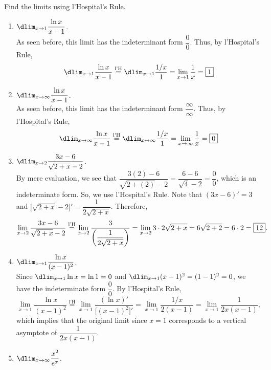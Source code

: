 \documentclass{book}
\newcommand{\lHeq}{\overset{\text{l'H}}{=}}
\begin{document}
\begin{Exam} Find the limits using l'Hospital's Rule.\\
\begin{enumerate}
\item $\dlim_{x\to 1} \dfrac{\ln x}{x-1}$.\\

As seen before, this limit has the indeterminant form $\dfrac{0}{0}$. Thus, by l'Hospital's Rule,
\[\dlim_{x\to 1} \dfrac{\ln x}{x-1} \lHeq \dlim_{x\to 1} \dfrac{1/x}{1} = \lim_{x\to 1} \dfrac{1}{x} = \fbox{$1$}\]\vs

\item $\dlim_{x\to \infty} \dfrac{\ln x}{x-1}$.\\

As seen before, this limit has the indeterminant form $\dfrac{\infty}{\infty}$. Thus, by l'Hospital's Rule,
\[\dlim_{x\to \infty} \dfrac{\ln x}{x-1} \lHeq \dlim_{x\to \infty} \dfrac{1/x}{1} = \lim_{x\to \infty} \dfrac{1}{x} = \fbox{$0$}\]\vs

\item $\dlim_{x\to 2} \dfrac{3x-6}{\sqrt{2+x} - 2}$.\\

By mere evaluation, we see that $\dfrac{3(2) - 6}{\sqrt{2+(2)} - 2} = \dfrac{6-6}{\sqrt{4}-2} = \dfrac{0}{0}$, which is an indeterminate form. So, we use l'Hospital's Rule. Note that $(3x-6)' = 3$ and $\big[\sqrt{2+x}-2\big]' = \dfrac{1}{2\sqrt{2+x}}$. Therefore, \[\lim_{x\to 2} \dfrac{3x-6}{\sqrt{2+x} - 2} \lHeq \lim_{x\to 2} \dfrac{3}{\left(\dfrac{1}{2\sqrt{2+x}}\right)} = \lim_{x\to 2} 3\cdot2\sqrt{2+x} = 6\sqrt{2+2} = 6\cdot 2 = \fbox{$12$}.\]\vs

\item $\dlim_{x\to 1} \dfrac{\ln x}{(x-1)^2}$.\\

Since $\dlim_{x\to 1} \ln x = \ln 1 = 0$ and $\dlim_{x\to 1} (x-1)^2 = (1-1)^2 = 0$, we have the indeterminate form $\dfrac{0}{0}$. By l'Hospital's Rule,
\[\lim_{x\to 1} \dfrac{\ln x}{(x-1)^2} \lHeq \lim_{x\to 1} \dfrac{(\ln x)'}{\big[(x-1)^2\big]'} = \lim_{x\to 1} \dfrac{1/x}{2(x-1)} = \lim_{x\to 1} \dfrac{1}{2x(x-1)}, \] which implies that the original limit  since $x=1$ corresponds to a vertical asymptote of $\dfrac{1}{2x(x-1)}$.\\

\item $\dlim_{x\to \infty} \dfrac{x^2}{e^x}$.\\


\end{enumerate}
\end{Exam}
\end{document}
